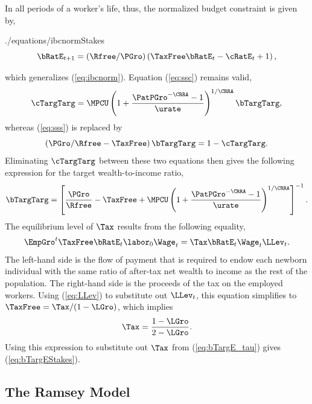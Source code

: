 \documentclass[titlepage]{\econtex}\newcommand{\texname}{cjSOE}
\begin{document}
In all periods of a worker's life, thus, the normalized budget constraint is given by,
\begin{verbatimwrite}{./equations/ibcnormStakes}
\begin{equation}
\bRatE_{t+1} = (\Rfree /\PGro) \left(\TaxFree \bRatE_{t} -\cRatE_{t}+1\right),
\label{eq:ibcnormStakes}
\end{equation}
\end{verbatimwrite}

which generalizes (\ref{eq:ibcnorm}). Equation (\ref{eq:ssc}) remains valid,
\begin{equation*}
\cTargTarg = \MPCU \left(1+\frac{\PatPGro^{-\CRRA}-1}{\urate}\right)^{1/\CRRA} \bTargTarg,
\end{equation*}
whereas (\ref{eq:sss}) is replaced by
\begin{equation*}
\left(\PGro/\Rfree-\TaxFree \right) \bTargTarg = 1 -\cTargTarg.
\end{equation*}
Eliminating $\cTargTarg$ between these two equations then gives the following expression for the target wealth-to-income ratio,
\begin{equation}
 \bTargTarg= \left[\frac{\PGro}{\Rfree}-\TaxFree+\MPCU \left(1+\frac{\PatPGro^{-\CRRA}-1}{\urate}\right)^{1/\CRRA}\right]^{-1}.
\label{eq:bTargE_tau}
\end{equation}
The equilibrium level of $\Tax$ results from the following equality,
\begin{equation*}
\EmpGro^t \TaxFree \bRatE_t \labor_0 \Wage_t  = \Tax \bRatE_t \Wage_t \LLev_t.
\label{eq:gbc}
\end{equation*}
The left-hand side is the flow of payment that is required to endow each newborn individual with the same ratio of after-tax net wealth to income as the rest of the population. The right-hand side is the proceeds of the tax on the employed workers. Using (\ref{eq:LLev}) to substitute out $\LLev_t$, this equation simplifies to $\TaxFree = \Tax / (1-
\LGro)$, which implies
\begin{equation}
\Tax=\frac{1-\LGro}{2-\LGro}.
\label{eq:tau}
\end{equation}
Using this expression to substitute out $\Tax$ from (\ref{eq:bTargE_tau}) gives (\ref{eq:bTargEStakes}).

\medskip

\subsection{The Ramsey Model}
\end{document}
